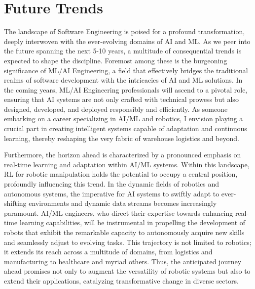 \documentclass[11pt]{article}
\begin{document}
    
\section*{Future Trends}

The landscape of Software Engineering is poised for a profound transformation, deeply interwoven with the ever-evolving domains of AI and ML. As we peer into the future spanning the next 5-10 years, a multitude of consequential trends is expected to shape the discipline. Foremost among these is the burgeoning significance of ML/AI Engineering, a field that effectively bridges the traditional realms of software development with the intricacies of AI and ML solutions. In the coming years, ML/AI Engineering professionals will ascend to a pivotal role, ensuring that AI systems are not only crafted with technical prowess but also designed, developed, and deployed responsibly and efficiently. As someone embarking on a career specializing in AI/ML and robotics, I envision playing a crucial part in creating intelligent systems capable of adaptation and continuous learning, thereby reshaping the very fabric of warehouse logistics and beyond.

Furthermore, the horizon ahead is characterized by a pronounced emphasis on real-time learning and adaptation within AI/ML systems. Within this landscape, RL for robotic manipulation holds the potential to occupy a central position, profoundly influencing this trend. In the dynamic fields of robotics and autonomous systems, the imperative for AI systems to swiftly adapt to ever-shifting environments and dynamic data streams becomes increasingly paramount. AI/ML engineers, who direct their expertise towards enhancing real-time learning capabilities, will be instrumental in propelling the development of robots that exhibit the remarkable capacity to autonomously acquire new skills and seamlessly adjust to evolving tasks. This trajectory is not limited to robotics; it extends its reach across a multitude of domains, from logistics and manufacturing to healthcare and myriad others. Thus, the anticipated journey ahead promises not only to augment the versatility of robotic systems but also to extend their applications, catalyzing transformative change in diverse sectors.



\end{document}
